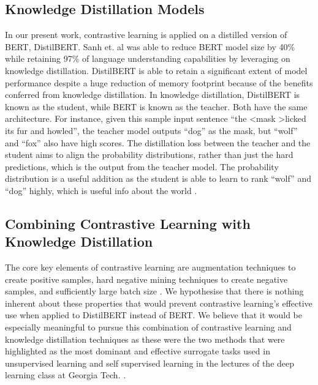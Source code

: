 \documentclass[10pt,twocolumn,letterpaper]{article}
\begin{document}
\subsection{Knowledge Distillation Models}

In our present work, contrastive learning is applied on a distilled version of BERT, DistilBERT. Sanh et. al \cite{1910.01108} was able to reduce BERT model size by 40\% while retaining 97\% of language understanding capabilities by leveraging on knowledge distillation. DistilBERT is able to retain a significant extent of model performance despite a huge reduction of memory footprint because of the benefits conferred from knowledge distillation. In knowledge distillation, DistilBERT is known as the student, while BERT is known as the teacher. Both have the same architecture. For instance, given this sample input sentence ``the \textless mask \textgreater licked its fur and howled'', the teacher model outputs ``dog'' as the mask, but ``wolf'' and ``fox'' also have high scores. The distillation loss between the teacher and the student aims to align the probability distributions, rather than just the hard predictions, which is the output from the teacher model. The probability distribution is a useful addition as the student is able to learn to rank ``wolf'' and ``dog'' highly, which is useful info about the world \cite{1910.01108}.

\subsection{Combining Contrastive Learning with Knowledge Distillation}

The core key elements of contrastive learning are augmentation techniques to create positive samples, hard negative mining techniques to create negative samples, and sufficiently large batch size \cite{2002.05709}. We hypothesise that there is nothing inherent about these properties that would prevent contrastive learning’s effective use when applied to DistilBERT instead of BERT.  We believe that it would be especially meaningful to pursue this combination of contrastive learning and knowledge distillation techniques as these were the two methods that were highlighted as the most dominant and effective surrogate tasks used in unsupervised learning and self supervised learning in the lectures of the deep learning class at Georgia Tech. \cite{gatech}.
\end{document}
